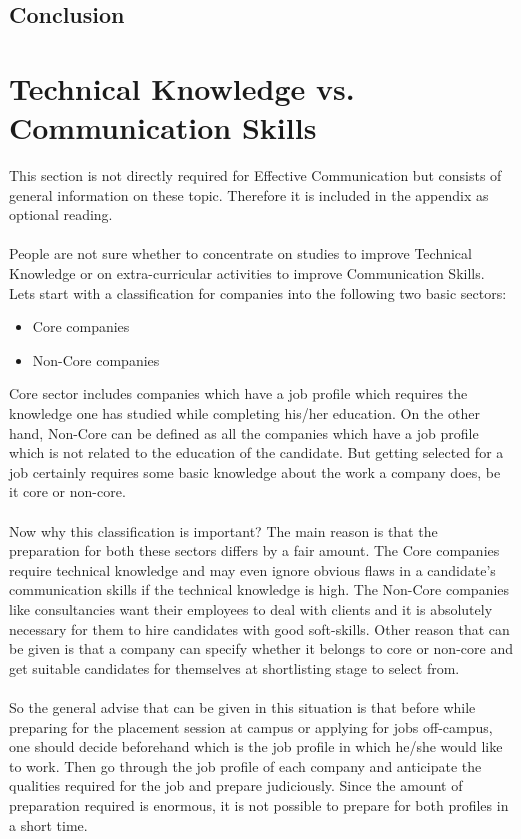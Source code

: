 \documentclass[a4paper,12pt]{report}
\begin{document}
\section{Conclusion}

\appendix
\chapter{Technical Knowledge vs. Communication Skills}
This section is not directly required for Effective Communication but consists of general information on
these topic. Therefore it is included in the appendix as optional reading.
\subsubsection{}
People are not sure whether to concentrate on studies to improve Technical Knowledge or on extra-curricular activities
 to improve Communication Skills. Lets start with a classification for companies into the following two basic sectors:
\begin{itemize}
 \item Core companies
 \item Non-Core companies
\end{itemize}
Core sector includes companies which have a job profile which requires the knowledge one has studied 
while completing his/her education. On the other hand, Non-Core can be defined as all the companies which 
have a job profile which is not related to the education of the candidate. But getting selected for a job
certainly requires some basic knowledge about the work a company does, be it core or non-core.
\subsubsection{}
Now why this classification is important? The main reason is that the preparation for both these sectors
 differs by a fair amount. The Core companies require technical knowledge and may even ignore obvious flaws in
a candidate's communication skills if the technical knowledge is high. The Non-Core companies like consultancies
want their employees to deal with clients and it is absolutely necessary for them to hire candidates with good
soft-skills. Other reason that can be given is that a company can specify whether it belongs to core or non-core
and get suitable candidates for themselves at shortlisting stage to select from.
\subsubsection{}
So the general advise that can be given in this situation is that before while preparing for the placement session 
at campus or applying for jobs off-campus, one should decide beforehand which is the job profile in which he/she would like to work. 
Then go through the job profile of each company and anticipate the qualities required for the job and prepare judiciously.
Since the amount of preparation required is enormous, it is not possible to prepare for both profiles in a short time.
\end{document}
